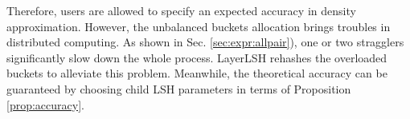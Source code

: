 Therefore, users are allowed to specify an expected accuracy in density approximation. However, the unbalanced buckets allocation brings troubles in distributed computing. As shown in Sec. \ref{sec:expr:allpair}), one or two stragglers significantly slow down the whole process. LayerLSH rehashes the overloaded buckets to alleviate this problem. Meanwhile, the theoretical accuracy can be guaranteed by choosing child LSH parameters in terms of Proposition \ref{prop:accuracy}.




